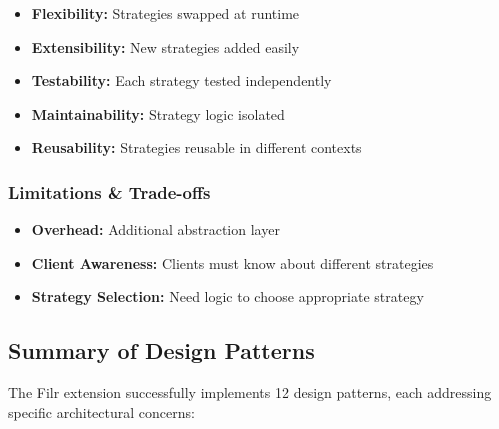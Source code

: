 \documentclass[11pt, a4paper]{article}
\theoremstyle{plain}
\theoremstyle{definition}
\begin{document}
\begin{itemize}
    \item \textbf{Flexibility:} Strategies swapped at runtime
    \item \textbf{Extensibility:} New strategies added easily
    \item \textbf{Testability:} Each strategy tested independently
    \item \textbf{Maintainability:} Strategy logic isolated
    \item \textbf{Reusability:} Strategies reusable in different contexts
\end{itemize}

\subsubsection{Limitations \& Trade-offs}

\begin{itemize}
    \item \textbf{Overhead:} Additional abstraction layer
    \item \textbf{Client Awareness:} Clients must know about different strategies
    \item \textbf{Strategy Selection:} Need logic to choose appropriate strategy
\end{itemize}

\subsection{Summary of Design Patterns}

The Filr extension successfully implements 12 design patterns, each addressing specific architectural concerns:
\end{document}
